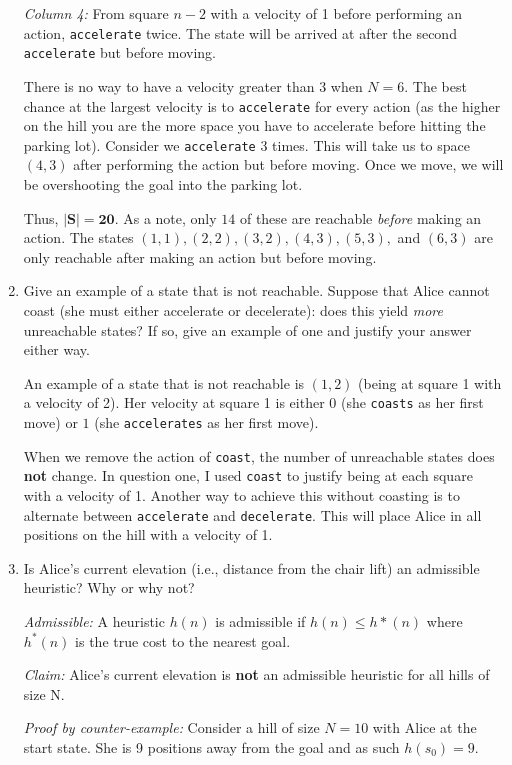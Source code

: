 \documentclass[fleqn]{hermans-hw}
\begin{document}
\begin{enumerate}
\textit{Column 4:} From square $n - 2$ with a velocity of 1 before performing an action, \texttt{accelerate} twice. The state will be arrived at after the second \texttt{accelerate} but before moving.

There is no way to have a velocity greater than $3$ when $N = 6$. The best chance at the largest velocity is to \texttt{accelerate} for every action (as the higher on the hill you are the more space you have to accelerate before hitting the parking lot). Consider we \texttt{accelerate} 3 times. This will take us to space $(4, 3)$ after performing the action but before moving. Once we move, we will be overshooting the goal into the parking lot.

Thus, $\mathbf{|S| = 20}$. As a note, only $14$ of these are reachable \textit{before} making an action. The states $(1, 1), (2, 2), (3, 2), (4, 3), (5, 3),$ and $(6,3)$ are only reachable after making an action but before moving.

\item Give an example of a state that is not reachable.  Suppose that
Alice cannot coast (she must either accelerate or decelerate): does this
yield \emph{more} unreachable states? If so, give an example of one and
justify your answer either way.

An example of a state that is not reachable is $(1, 2)$ (being at square 1 with a velocity of 2). Her velocity at square 1 is either $0$ (she \texttt{coasts} as her first move) or $1$ (she \texttt{accelerates} as her first move).

When we remove the action of \texttt{coast}, the number of unreachable states does \textbf{not} change. In question one, I used \texttt{coast} to justify being at each square with a velocity of 1. Another way to achieve this without coasting is to alternate between \texttt{accelerate} and \texttt{decelerate}. This will place Alice in all positions on the hill with a velocity of 1.

\item Is Alice's current elevation (i.e., distance from the chair lift)
an admissible heuristic?  Why or why not?

\textit{Admissible:} A heuristic $h(n)$ is admissible if $h(n) \leq h*(n)$ where $h^*(n)$ is the true cost to the nearest goal.

\textit{Claim:} Alice's current elevation is \textbf{not} an admissible heuristic for all hills of size N.

\textit{Proof by counter-example:} Consider a hill of size $N = 10$ with Alice at the start state. She is 9 positions away from the goal and as such $h(s_0) = 9$.


\end{enumerate}
\end{document}
